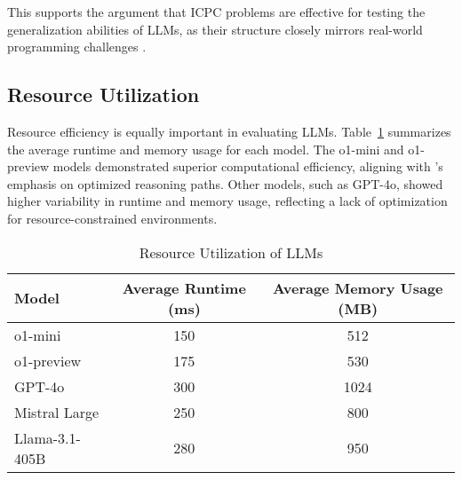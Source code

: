 This supports the argument that ICPC problems are effective for testing the generalization abilities of LLMs, as their structure closely mirrors real-world programming challenges \cite{b1,b27}.

\subsection{Resource Utilization}
Resource efficiency is equally important in evaluating LLMs. Table~\ref{tab:resource_utilization} summarizes the average runtime and memory usage for each model. The o1-mini and o1-preview models demonstrated superior computational efficiency, aligning with \cite{b4}'s emphasis on optimized reasoning paths. Other models, such as GPT-4o, showed higher variability in runtime and memory usage, reflecting a lack of optimization for resource-constrained environments.

\begin{table}[htbp]
    \caption{Resource Utilization of LLMs}
    \centering
    \begin{tabular}{@{}lcc@{}}
        \toprule
        \textbf{Model} & \textbf{Average Runtime (ms)} & \textbf{Average Memory Usage (MB)} \\ \midrule
        o1-mini        & 150                          & 512                                \\
        o1-preview     & 175                          & 530                                \\
        GPT-4o         & 300                          & 1024                               \\
        Mistral Large  & 250                          & 800                                \\
        Llama-3.1-405B  & 280                          & 950                                \\ \bottomrule
    \end{tabular}
    \label{tab:resource_utilization}
\end{table}

